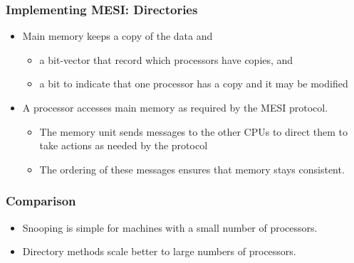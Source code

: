 \documentclass[../main.tex]{subfiles}
\begin{document}
\subsubsection{Implementing MESI: Directories}

\begin{itemize}
	\item Main memory keeps a copy of the data and
	      \begin{itemize}
		      \item a bit-vector that record which processors have copies, and
		      \item a bit to indicate that one processor has a copy and it may be modified
	      \end{itemize}
	\item A processor accesses main memory as required by the MESI protocol.
	      \begin{itemize}
		      \item The memory unit sends messages to the other CPUs to direct them to take actions as needed by the protocol
		      \item The ordering of these messages ensures that memory stays consistent.
	      \end{itemize}
	      \end{itemize}

	\subsubsection{Comparison}
	      \begin{itemize}
		      \item Snooping is simple for machines with a small number of processors.
		      \item Directory methods scale better to large numbers of processors.
	      \end{itemize}
\end{document}
